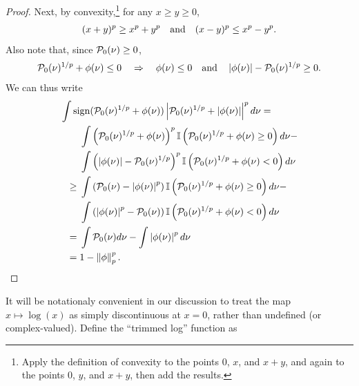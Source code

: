 \begin{lem}
\begin{proof}
Next, by convexity,\footnote{Apply the definition of convexity to the points
$0$, $x$, and $x + y$, and again to the points $0$, $y$, and $x+y$, then add the
results.} for any $x \ge y \ge 0$,
%
\begin{align*}
%
(x + y)^p \ge{} x^p + y^p \mathand
(x - y)^p \le{} x^p - y^p.
%
\end{align*}
%
Also note that, since $\mathcal{P}_{0}(\nu) \ge 0$,
%
\begin{align*}
%
\pbase(\nu)^{1/p} + \phi(\nu) \le 0
\quad\Rightarrow\quad
\phi(\nu) \le 0 \mathand
\abs{\phi(\nu)} - \pbase(\nu)^{1/p} \ge 0.
%
\end{align*}
%
We can thus write
%
\begin{align*}
%
\MoveEqLeft
\int \mathrm{sign}(\pbase(\nu)^{1/p} + \phi(\nu))
    \abs{\pbase(\nu)^{1/p} + \abs{\phi(\nu)}}^{p} d\nu
={}\\&
    \int \left(\pbase(\nu)^{1/p} + \phi(\nu)\right)^{p}
        \ind{\pbase(\nu)^{1/p} + \phi(\nu) \ge 0}
        d\nu - \\&
    \int \left(\abs{\phi(\nu)} - \pbase(\nu)^{1/p}\right)^{p}
        \ind{\pbase(\nu)^{1/p} + \phi(\nu) < 0}
        d\nu
\\\ge{}&
    \int \left(\pbase(\nu) - \abs{\phi(\nu)}^{p}\right)
        \ind{\pbase(\nu)^{1/p} + \phi(\nu) \ge 0}
        d\nu - \\&
    \int \left(\abs{\phi(\nu)}^p - \pbase(\nu)\right)
        \ind{\pbase(\nu)^{1/p} + \phi(\nu) < 0}
        d\nu
\\={}&
    \int \pbase(\nu) d\nu - \int \abs{\phi(\nu)}^p d\nu
\\={}&
    1 - \norm{\phi}_p^p.
%
\end{align*}
%
\end{proof}
%
\end{lem}


It will be notationaly convenient in our discussion to treat the map $x \mapsto
\log(x)$ as simply discontinuous at $x = 0$, rather than undefined (or
complex-valued). Define the ``trimmed log'' function as

